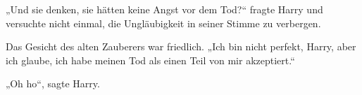 „Und sie denken, sie hätten keine Angst vor dem Tod?“ fragte Harry und versuchte nicht einmal, die Ungläubigkeit in seiner Stimme zu verbergen.

Das Gesicht des alten Zauberers war friedlich.
„Ich bin nicht perfekt, Harry, aber ich glaube, ich habe meinen Tod als einen Teil von mir akzeptiert.“

„Oh ho“, sagte Harry.
